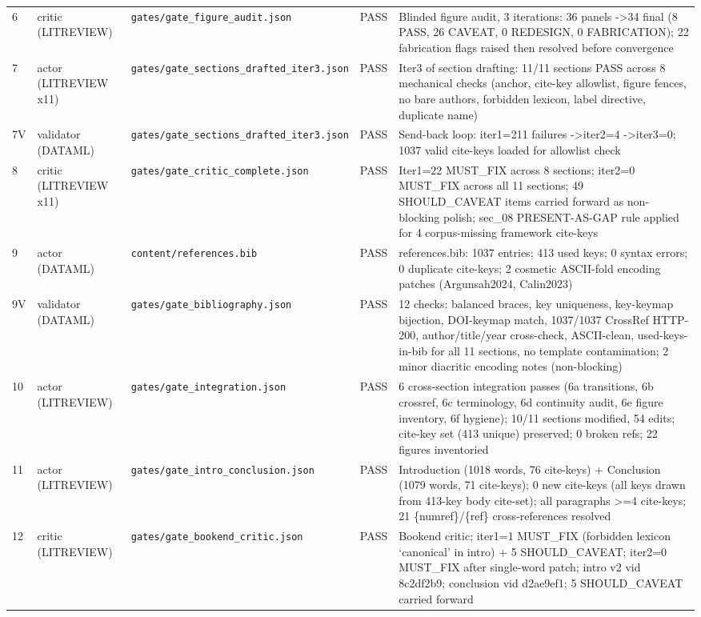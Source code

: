 \documentclass[11pt]{article}
\begin{document}
\begin{tabular}{p{}p{}p{}p{}p{}}
6 & critic (LITREVIEW) & \texttt{gates/gate\_figure\_audit.json} & PASS & Blinded figure audit, 3 iterations: 36 panels -\textgreater  34 final (8 PASS, 26 CAVEAT, 0 REDESIGN, 0 FABRICATION); 22 fabrication flags raised then resolved before convergence \\
7 & actor (LITREVIEW x11) & \texttt{gates/gate\_sections\_drafted\_iter3.json} & PASS & Iter3 of section drafting: 11/11 sections PASS across 8 mechanical checks (anchor, cite-key allowlist, figure fences, no bare authors, forbidden lexicon, label directive, duplicate name) \\
7V & validator (DATAML) & \texttt{gates/gate\_sections\_drafted\_iter3.json} & PASS & Send-back loop: iter1=211 failures -\textgreater  iter2=4 -\textgreater  iter3=0; 1037 valid cite-keys loaded for allowlist check \\
8 & critic (LITREVIEW x11) & \texttt{gates/gate\_critic\_complete.json} & PASS & Iter1=22 MUST\_FIX across 8 sections; iter2=0 MUST\_FIX across all 11 sections; 49 SHOULD\_CAVEAT items carried forward as non-blocking polish; sec\_08 PRESENT-AS-GAP rule applied for 4 corpus-missing framework cite-keys \\
9 & actor (DATAML) & \texttt{content/references.bib} & PASS & references.bib: 1037 entries; 413 used keys; 0 syntax errors; 0 duplicate cite-keys; 2 cosmetic ASCII-fold encoding patches (Argunsah2024, Calin2023) \\
9V & validator (DATAML) & \texttt{gates/gate\_bibliography.json} & PASS & 12 checks: balanced braces, key uniqueness, key-keymap bijection, DOI-keymap match, 1037/1037 CrossRef HTTP-200, author/title/year cross-check, ASCII-clean, used-keys-in-bib for all 11 sections, no template contamination; 2 minor diacritic encoding notes (non-blocking) \\
10 & actor (LITREVIEW) & \texttt{gates/gate\_integration.json} & PASS & 6 cross-section integration passes (6a transitions, 6b crossref, 6c terminology, 6d continuity audit, 6e figure inventory, 6f hygiene); 10/11 sections modified, 54 edits; cite-key set (413 unique) preserved; 0 broken refs; 22 figures inventoried \\
11 & actor (LITREVIEW) & \texttt{gates/gate\_intro\_conclusion.json} & PASS & Introduction (1018 words, 76 cite-keys) + Conclusion (1079 words, 71 cite-keys); 0 new cite-keys (all keys drawn from 413-key body cite-set); all paragraphs \textgreater =4 cite-keys; 21 \{numref\}/\{ref\} cross-references resolved \\
12 & critic (LITREVIEW) & \texttt{gates/gate\_bookend\_critic.json} & PASS & Bookend critic; iter1=1 MUST\_FIX (forbidden lexicon `canonical' in intro) + 5 SHOULD\_CAVEAT; iter2=0 MUST\_FIX after single-word patch; intro v2 vid 8c2df2b9; conclusion vid d2ae9ef1; 5 SHOULD\_CAVEAT carried forward \\

\end{tabular}
\end{document}
